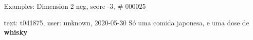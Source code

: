 \begin{frame}{Examples: Dimension 2 neg, score -3, \# 000025}
\footnotesize
\begin{alertblock}{text: t041875, user: unknown, 2020-05-30}
Só uma comida japonesa, e uma dose de \textbf{whisky}  
 \textbf{}  
 \textbf{} 
  
\end{alertblock}
\end{frame}
